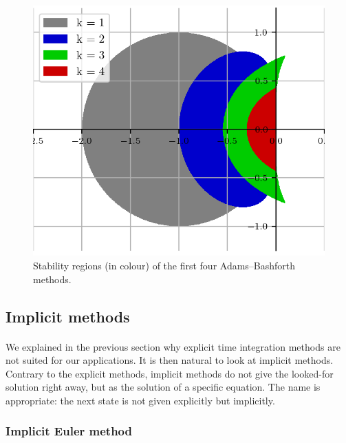         \begin{figure}
          \centering
          \includegraphics{figures/ab_stab.png}
          \caption{Stability regions (in colour) of the first four Adams--Bashforth methods.}
          \label{fig:ab_stab}
        \end{figure}


    \subsection{Implicit methods}

      \paragraph{}
      We explained in the previous section why explicit time integration methods are not suited for our applications.
      It is then natural to look at implicit methods.
      Contrary to the explicit methods, implicit methods do not give the looked-for solution right away, but as the solution of a specific equation.
      The name is appropriate: the next state is not given explicitly but implicitly.


      \subsubsection{Implicit Euler method}

